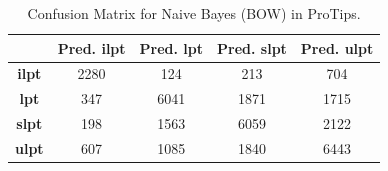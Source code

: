 \documentclass[11pt,a4paper]{article}
\begin{document}
\begin{table}[h!]
\centering
\begin{tabular}{c|c|c|c|c|}
\cline{2-5}
                                                            & \cellcolor[HTML]{EFEFEF}\textbf{Pred. ilpt} & \cellcolor[HTML]{EFEFEF}\textbf{Pred. lpt} & \cellcolor[HTML]{EFEFEF}\textbf{Pred. slpt} & \cellcolor[HTML]{EFEFEF}\textbf{Pred. ulpt} \\ \hline
\multicolumn{1}{|c|}{\cellcolor[HTML]{EFEFEF}\textbf{ilpt}} & 2280                                        & 124                                        & 213                                         & 704                                         \\ \hline
\multicolumn{1}{|c|}{\cellcolor[HTML]{EFEFEF}\textbf{lpt}}  & 347                                         & 6041                                       & 1871                                        & 1715                                        \\ \hline
\multicolumn{1}{|c|}{\cellcolor[HTML]{EFEFEF}\textbf{slpt}} & 198                                         & 1563                                       & 6059                                        & 2122                                        \\ \hline
\multicolumn{1}{|c|}{\cellcolor[HTML]{EFEFEF}\textbf{ulpt}} & 607                                         & 1085                                       & 1840                                        & 6443                                        \\ \hline
\end{tabular}
\caption{Confusion Matrix for Naive Bayes (BOW) in ProTips.}
\label{table:nb_cf}
\end{table}
\end{document}
